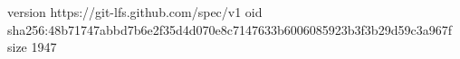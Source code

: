 version https://git-lfs.github.com/spec/v1
oid sha256:48b71747abbd7b6e2f35d4d070e8c7147633b6006085923b3f3b29d59c3a967f
size 1947
